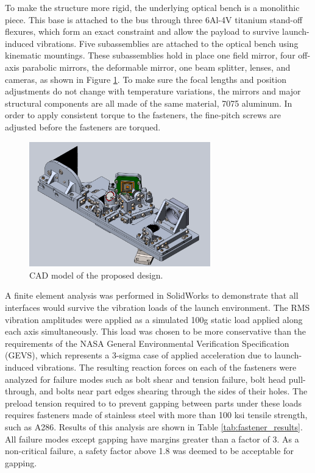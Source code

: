 \documentclass[]{spie}  %
\begin{document}
To make the structure more rigid, the underlying optical bench is a monolithic piece. This base is attached to the bus through three 6Al-4V titanium stand-off flexures, which form an exact constraint and allow the payload to survive launch-induced vibrations. Five subassemblies are attached to the optical bench using kinematic mountings. These subassemblies hold in place one field mirror, four off-axis parabolic mirrors, the deformable mirror, one beam splitter, lenses, and cameras, as shown in Figure \ref{fig:SWassembly}. To make sure the focal lengths and position adjustments do not change with temperature variations, the mirrors and major structural components are all made of the same material, 7075 aluminum. In order to apply consistent torque to the fasteners, the fine-pitch screws are adjusted before the fasteners are torqued.

\begin{figure}
\centering
\includegraphics[width=0.70\textwidth]{DeMiSW.PNG}
\caption{\label{fig:SWassembly}CAD model of the proposed design.}
\end{figure}

A finite element analysis was performed in SolidWorks to demonstrate that all interfaces would survive the vibration loads of the launch environment. The RMS vibration amplitudes were applied as a simulated 100g static load applied along each axis simultaneously. This load was chosen to be more conservative than the requirements of the NASA General Environmental Verification Specification (GEVS)\cite{milne_general_2003}, which represents a 3-sigma case of applied acceleration due to launch-induced vibrations.  The resulting reaction forces on each of the fasteners were analyzed for failure modes such as bolt shear and tension failure, bolt head pull-through, and bolts near part edges shearing through the sides of their holes. The preload tension required to to prevent gapping between parts under these loads requires fasteners made of stainless steel with more than 100 ksi tensile strength, such as A286. Results of this analysis are shown in Table \ref{tab:fastener_results}. All failure modes except gapping have margins greater than a factor of 3. As a non-critical failure, a safety factor above 1.8 was deemed to be acceptable for gapping.
\end{document}
